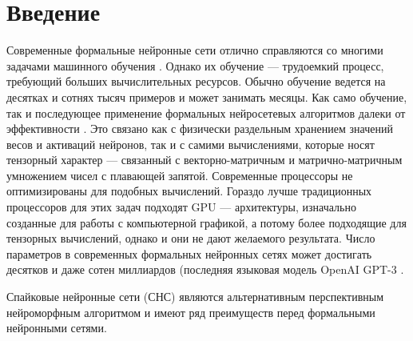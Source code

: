 \documentclass[a4paper]{article}
\begin{document}
\pagebreak

\section*{Введение}

Современные формальные нейронные сети отлично справляются со многими задачами машинного обучения \cite{pmlr-v28-wan13, Khan_2020}. Однако их обучение --- трудоемкий процесс, требующий больших вычислительных ресурсов. Обычно обучение ведется на десятках и сотнях тысяч примеров и может занимать месяцы. Как само обучение, так и последующее применение формальных нейросетевых алгоритмов далеки от эффективности \cite{Edwards2015GrowingPF}. Это связано как с физически раздельным хранением значений весов и активаций нейронов, так и с самими вычислениями, которые носят тензорный характер --- связанный с векторно-матричным и матрично-матричным умножением чисел с плавающей запятой. Современные процессоры не оптимизированы для подобных вычислений. Гораздо лучше традиционных процессоров для этих задач подходят GPU --- архитектуры, изначально созданные для работы с компьютерной графикой, а потому более подходящие для тензорных вычислений, однако и они не дают желаемого результата. Число параметров в современных формальных нейронных сетях может достигать десятков \cite{ManyParams, Khan_2020} и даже сотен миллиардов (последняя языковая модель OpenAI GPT-3 \cite{brown2020language}.

Спайковые нейронные сети (СНС) являются альтернативным перспективным нейроморфным алгоритмом и имеют ряд преимуществ перед формальными нейронными сетями.
\end{document}
